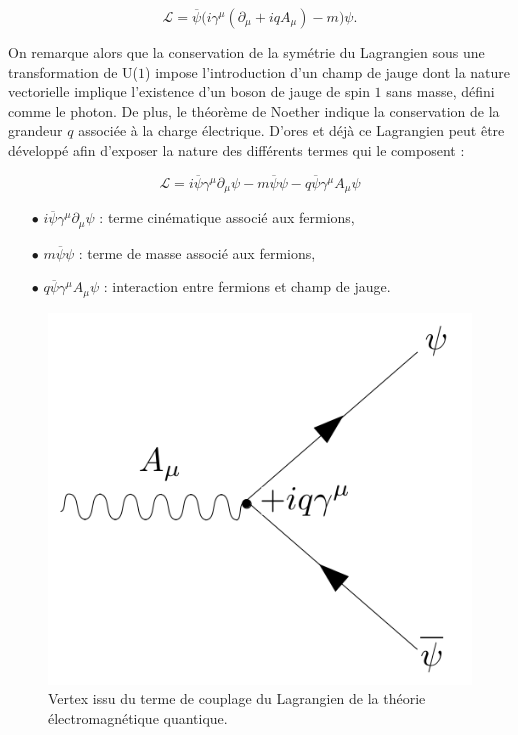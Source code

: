         \begin{equation}
            \mathcal{L}=\overline{\psi}\bigl(i\gamma^{\mu}(\partial_{\mu}+iqA_{\mu})-m\bigr)\psi.
        \end{equation}

        On remarque alors que la conservation de la symétrie du Lagrangien sous une transformation de U($1$) impose l'introduction d'un champ de jauge dont la nature vectorielle implique l'existence d'un boson de jauge de spin $1$ sans masse, défini comme le photon. De plus, le théorème de Noether indique la conservation de la grandeur $q$ associée à la charge électrique. D'ores et déjà ce Lagrangien peut être développé afin d'exposer la nature des différents termes qui le composent :

        \begin{equation}
            \boxed{\mathcal{L}=
            i\overline{\psi}\gamma^{\mu}\partial_{\mu}\psi
            -m\overline{\psi}\psi
            -q\overline{\psi}\gamma^{\mu}A_{\mu}\psi}
        \end{equation}

        \begin{enumerate}
            \item[$\bullet$] $i\overline{\psi}\gamma^{\mu}\partial_{\mu}\psi$ : terme cinématique associé aux fermions,
            \item[$\bullet$] $m\overline{\psi}\psi$ : terme de masse associé aux fermions,
            \item[$\bullet$] $q\overline{\psi}\gamma^{\mu}A_{\mu}\psi$ : interaction entre fermions et champ de jauge. \\
        \end{enumerate}

        \begin{figure}
            \centering
            \includegraphics[scale=0.32]{Chapitre2/Images/psiApsi.png} 
            \caption{Vertex issu du terme de couplage du Lagrangien de la théorie électromagnétique quantique.}
        \label{psiApsi}
        \end{figure}

